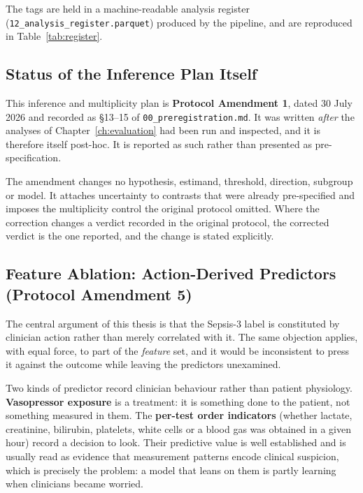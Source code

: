 The tags are held in a machine-readable analysis register
(\texttt{12\_analysis\_\allowbreak register\allowbreak .parquet}) produced by
the pipeline, and are
reproduced in Table~\ref{tab:register}.

\subsection{Status of the Inference Plan Itself}

This inference and multiplicity plan is \textbf{Protocol Amendment 1}, dated
30 July 2026 and recorded as \S13--15 of
\texttt{00\_preregistration.md}. It was written \emph{after} the analyses of
Chapter~\ref{ch:evaluation} had been run and inspected, and it is therefore
itself post-hoc. It is reported as such rather than presented as
pre-specification.

The amendment changes no hypothesis, estimand, threshold, direction, subgroup
or model. It attaches uncertainty to contrasts that were already pre-specified
and imposes the multiplicity control the original protocol omitted. Where the
correction changes a verdict recorded in the original protocol, the corrected
verdict is the one reported, and the change is stated explicitly.

\subsection{Feature Ablation: Action-Derived Predictors (Protocol Amendment 5)}
\label{sec:ablation_method}

The central argument of this thesis is that the Sepsis-3 label is constituted
by clinician action rather than merely correlated with it. The same objection
applies, with equal force, to part of the \emph{feature} set, and it would be
inconsistent to press it against the outcome while leaving the predictors
unexamined.

Two kinds of predictor record clinician behaviour rather than patient
physiology. \textbf{Vasopressor exposure} is a treatment: it is something done
to the patient, not something measured in them. The \textbf{per-test order
indicators} (whether lactate, creatinine, bilirubin, platelets, white cells
or a blood gas was obtained in a given hour) record a decision to look. Their
predictive value is well established and is usually read as evidence that
measurement patterns encode clinical suspicion, which is precisely the problem:
a model that leans on them is partly learning when clinicians became worried.

